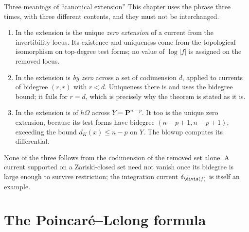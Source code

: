 \begin{warning}{Three meanings of ``canonical extension''}
This chapter uses the phrase three times, with three different contents, and
they must not be interchanged.
\begin{enumerate}
\item In  the extension is the unique
  \emph{zero extension} of a current from the invertibility locus.  Its
  existence and uniqueness come from the topological isomorphism on
  top-degree test forms; no value of $\log|f|$ is assigned on the removed
  locus.
\item In  the extension is
  \emph{by zero} across a set of codimension $d$, applied to currents of
  bidegree $(r,r)$ with $r<d$.  Uniqueness there is
  \cite[Lemma~7.1.13]{CLD25} and uses the bidegree bound; it fails for
  $r=d$, which is precisely why the theorem is stated as it is.
\item In  the extension is of $h\Omega$ across
  $Y=\mathbf P^{n-p}$.  It too is the unique zero extension, because
  its test forms have bidegree $(n-p+1,n-p+1)$, exceeding the bound
  $d_K(x)\le n-p$ on $Y$.  The blowup computes its differential.
\end{enumerate}
None of the three follows from the codimension of the removed set alone.  A
current supported on a Zariski-closed set need not vanish once its bidegree
is large enough to survive restriction; the integration current
$\delta_{\divis(f)}$ is itself an example.
\end{warning}

\section{The Poincar\'e--Lelong formula}
\label{sec:ch15-pl}

